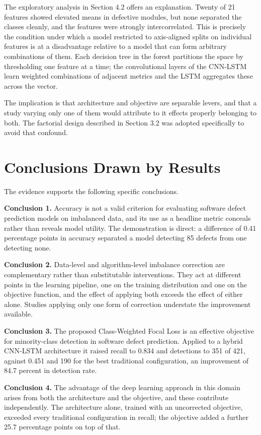 \documentclass[12pt,a4paper,oneside]{report}
\begin{document}
The exploratory analysis in Section 4.2 offers an explanation. Twenty of 21 features showed elevated means in defective modules, but none separated the classes cleanly, and the features were strongly intercorrelated. This is precisely the condition under which a model restricted to axis-aligned splits on individual features is at a disadvantage relative to a model that can form arbitrary combinations of them. Each decision tree in the forest partitions the space by thresholding one feature at a time; the convolutional layers of the CNN-LSTM learn weighted combinations of adjacent metrics and the LSTM aggregates these across the vector.

The implication is that architecture and objective are separable levers, and that a study varying only one of them would attribute to it effects properly belonging to both. The factorial design described in Section 3.2 was adopted specifically to avoid that confound.

\section{Conclusions Drawn by Results}

The evidence supports the following specific conclusions.

\textbf{Conclusion 1.} Accuracy is not a valid criterion for evaluating software defect prediction models on imbalanced data, and its use as a headline metric conceals rather than reveals model utility. The demonstration is direct: a difference of 0.41 percentage points in accuracy separated a model detecting 85 defects from one detecting none.

\textbf{Conclusion 2.} Data-level and algorithm-level imbalance correction are complementary rather than substitutable interventions. They act at different points in the learning pipeline, one on the training distribution and one on the objective function, and the effect of applying both exceeds the effect of either alone. Studies applying only one form of correction understate the improvement available.

\textbf{Conclusion 3.} The proposed Class-Weighted Focal Loss is an effective objective for minority-class detection in software defect prediction. Applied to a hybrid CNN-LSTM architecture it raised recall to 0.834 and detections to 351 of 421, against 0.451 and 190 for the best traditional configuration, an improvement of 84.7 percent in detection rate.

\textbf{Conclusion 4.} The advantage of the deep learning approach in this domain arises from both the architecture and the objective, and these contribute independently. The architecture alone, trained with an uncorrected objective, exceeded every traditional configuration in recall; the objective added a further 25.7 percentage points on top of that.
\end{document}
